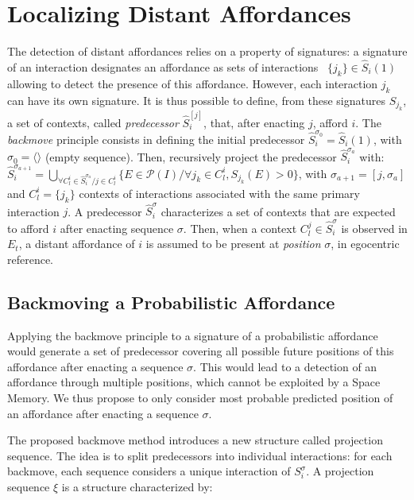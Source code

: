 \documentclass[conference]{IEEEtran}
\begin{document}
\section{Localizing Distant Affordances}\label{localize}


The detection of distant affordances relies on a property of signatures: a signature of an interaction designates an affordance as sets of interactions ~$\{j_k\} \in \hat{S}_i(1)$ allowing to detect the presence of this affordance.
However, each interaction $j_k$ can have its own signature. 
It is thus possible to define, from these signatures $S_{j_k}$, a set of contexts, called \textit{predecessor} $\hat{S}_i^{[j]}$, that, after enacting $j$, afford $i$. 
The \textit{backmove} principle consists in defining the initial predecessor $\hat{S}_i^{\sigma_0}=\hat{S}_i(1)$, with $\sigma_0=\langle\rangle$ (empty sequence). 
Then, recursively project the predecessor $\hat{S}_i^{\sigma_a}$ with:
$\hat{S}_i^{\sigma_{a+1}}\!=\!\bigcup_{\forall C_l^i \in \hat{S}_i^{\sigma_a} / j \in C_l^i} \{E \in \mathcal{P}(I) / \forall j_k \in C_l^i, S_{j_k}(E)\!>\!0\}$,
with $\sigma_{a+1}=[j,\sigma_a]$ and $C_l^i=\{j_k\}$ contexts of interactions associated with the same primary interaction $j$.
A predecessor $\hat{S}_i^\sigma$ characterizes a set of contexts that are expected to afford $i$ after enacting sequence $\sigma$.
Then, when a context $C_l^j \in \hat{S}_i^\sigma$ is observed in $E_t$, a distant affordance of $i$ is assumed to be present at \textit{position} $\sigma$, in egocentric reference.


\subsection{Backmoving a Probabilistic Affordance}\label{backmove}

Applying the backmove principle to a signature of a probabilistic affordance would generate a set of predecessor covering all possible future positions of this affordance after enacting a sequence $\sigma$. This would lead to a detection of an affordance through multiple positions, which cannot be exploited by a Space Memory.
We thus propose to only consider most probable predicted position of an affordance after enacting a sequence $\sigma$.

The proposed backmove method introduces a new structure called projection sequence. The idea is to split predecessors into individual interactions: for each backmove, each sequence considers a unique interaction of $S_i^{\sigma}$.
A projection sequence $\xi$ is a structure characterized by:
\end{document}
